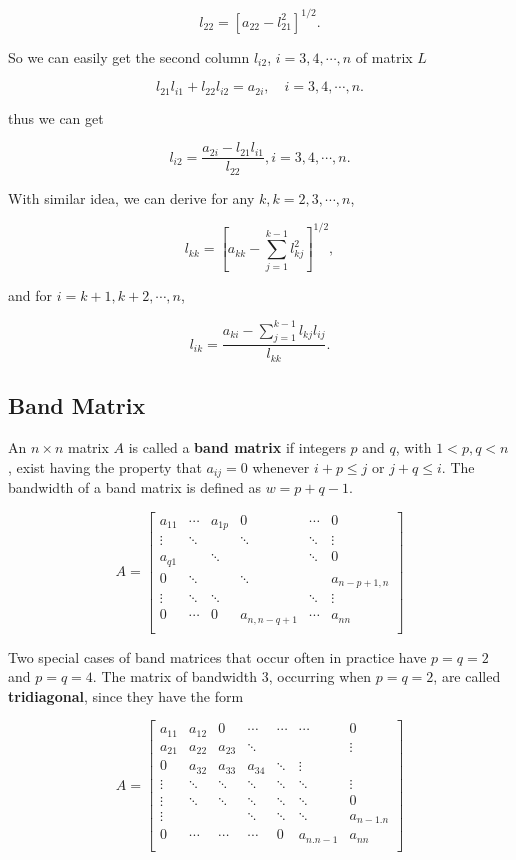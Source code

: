 \documentclass[preprint,12pt]{elsarticle}
\begin{document}
\[
l_{22}=[a_{22}-l_{21}^2]^{1/2}.
\]

So we can easily get the second column $l_{i2}$, $i=3,4,\cdots,n$ of matrix $L$

\[
l_{21}l_{i1}+l_{22}l_{i2}=a_{2i},\quad i=3,4,\cdots,n.
\]

thus we can get

\[
l_{i2}=\frac{a_{2i}-l_{21}l_{i1}}{l_{22}},i=3,4,\cdots,n.
\]

With similar idea, we can derive for any $k, k=2,3,\cdots,n$,

\[
l_{kk}=[a_{kk}-\sum_{j=1}^{k-1}l_{kj}^2]^{1/2},
\]

and for $i=k+1,k+2,\cdots,n$,

\[
l_{ik}=\frac{a_{ki}-\sum\limits_{j=1}^{k-1}{l_{kj}l_{ij}}}{l_{kk}}.
\]

\subsection{Band Matrix}
\label{SS:2.3}

An $n \times n$ matrix  $A$ is called a \textbf{band matrix} if integers $p$ and $q$, with $1 < p, q < n$, exist having the property that $a_{ij} = 0$ whenever $i + p\le j$ or $j + q \le i$. The bandwidth of a band matrix is defined as $w = p + q - 1$.

\[
A=\begin{bmatrix}
  a_{11} & \cdots & a_{1p} & 0 & \cdots & 0 \\
  \vdots & \ddots &  & \ddots & \ddots & \vdots \\
  a_{q1} & & \ddots &  & \ddots & 0\\
  0 & \ddots &  & \ddots &  &  a_{n-p+1,n}\\
  \vdots & \ddots &\ddots  &  & \ddots & \vdots \\
  0 & \cdots & 0 & a_{n,n-q+1} & \cdots & a_{nn} \\
\end{bmatrix}
\]

Two special cases of band matrices that occur often in practice have $p = q = 2$ and $p = q = 4$. The matrix of bandwidth $3$, occurring when $p = q = 2$, are called \textbf{tridiagonal}, since they have the form

\[
A= \begin{bmatrix}
  a_{11} & a_{12} & 0 & \cdots & \cdots &\cdots& 0 \\
  a_{21} & a_{22} & a_{23} & \ddots & & & \vdots \\
  0 & a_{32} & a_{33} & a_{34} & \ddots & \vdots \\
\vdots & \ddots & \ddots &\ddots  & \ddots &\ddots&  \vdots\\
  \vdots & \ddots & \ddots &\ddots  & \ddots&\ddots &  0\\
  \vdots & & & \ddots & \ddots & \ddots & a_{n-1.n} \\
  0 & \cdots &\cdots &\cdots & 0 & a_{n.n-1} & a_{nn} \\
\end{bmatrix}
\]
\end{document}
